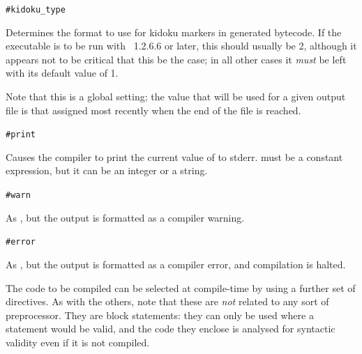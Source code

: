     \lstinline|#kidoku_type|~
    \begin{cmdesc}
      Determines the format to use for kidoku markers in generated bytecode. If
      the executable is to be run with \reallive\ 1.2.6.6 or later, this should
      usually be 2, although it appears not to be critical that this be the
      case; in all other cases it \emph{must} be left with its default value of
      1.

      Note that this is a global setting; the value that will be used for a
      given output file is that assigned most recently when the end of the file
      is reached.
    \end{cmdesc}

    \lstinline|#print|~
    \begin{cmdesc}
      Causes the compiler to print the current value of  to stderr.
       must be a constant expression, but it can be an integer or
      a string.
    \end{cmdesc}

    \lstinline|#warn|~
    \begin{cmdesc}
      As , but the output is formatted as a compiler warning.
    \end{cmdesc}

    \lstinline|#error|~
    \begin{cmdesc}
      As , but the output is formatted as a compiler error, and
      compilation is halted.
    \end{cmdesc}


    The code to be compiled can be selected at compile-time by using a further
    set of directives.  As with the others, note that these are \emph{not}
    related to any sort of preprocessor.  They are block statements: they can
    only be used where a statement would be valid, and the code they enclose
    is analysed for syntactic validity even if it is not compiled.

